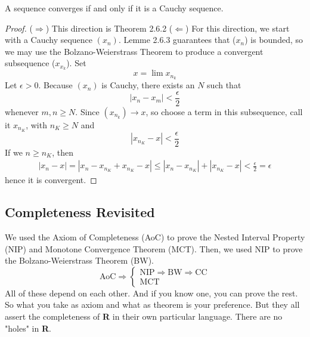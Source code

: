     \begin{theorem}
        A sequence converges if and only if it is a Cauchy sequence.
    \end{theorem}
    \begin{proof}
        ($\Rightarrow$) This direction is Theorem 2.6.2
        \newline
        ($\Leftarrow$) For this direction, we start with a Cauchy sequence $(x_n)$. Lemme 2.6.3 guarantees that ($x_n$) is bounded, so we may use the Bolzano-Weierstrass Theorem to produce a convergent subsequence ($x_{x_k}$). Set
        $$x = \lim x_{n_k}$$
        Let $\epsilon > 0$. Because $(x_n)$ is Cauchy, there exists an $N$ such that
        $$|x_n - x_m| < \frac{\epsilon}{2}$$
        whenever $m, n \geq N$. Since $(x_{n_k}) \rightarrow x$, so choose a term in this subsequence, call it $x_{n_K}$, with $n_K \geq N$ and
        $$|x_{n_K} - x| < \frac{\epsilon}{2}$$
        If we $n \geq n_K$, then
        \begin{align*}
            |x_n - x| = |x_n - x_{n_K} + x_{n_K} - x|
                \leq |x_n - x_{n_K}| + |x_{n_K} - x|
                < \frac{\epsilon}{2} = \epsilon
        \end{align*}
        hence it is convergent.
    \end{proof}
    \subsection*{Completeness Revisited}
    We used the Axiom of Completeness (AoC) to prove the Nested Interval Property (NIP) and Monotone Convergence Theorem (MCT). Then, we used NIP to prove the Bolzano-Weierstrass Theorem (BW).
    \begin{equation*}
        \text{AoC} \Rightarrow \begin{cases}
            \text{NIP}  \Rightarrow \text{BW} \Rightarrow \text{CC} \\
            \text{MCT}
        \end{cases}
    \end{equation*}
    All of these depend on each other. And if you know one, you can prove the rest. So what you take as axiom and what as theorem is your preference. But they all assert the completeness of \textbf{R} in their own particular language. There are no "holes" in \textbf{R}.